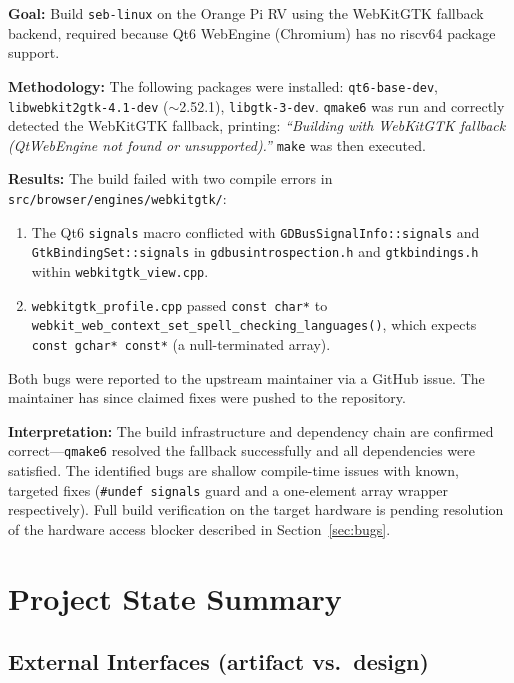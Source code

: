 \documentclass[11pt]{article}
\begin{document}
\textbf{Goal:} Build \texttt{seb-linux} on the Orange Pi RV using the WebKitGTK fallback backend, required because Qt6 WebEngine (Chromium) has no riscv64 package support.

\textbf{Methodology:} The following packages were installed: \texttt{qt6-base-dev}, \texttt{libwebkit2gtk-4.1-dev} ($\sim$2.52.1), \texttt{libgtk-3-dev}. \texttt{qmake6} was run and correctly detected the WebKitGTK fallback, printing: \textit{``Building with WebKitGTK fallback (QtWebEngine not found or unsupported).''} \texttt{make} was then executed.

\textbf{Results:} The build failed with two compile errors in \texttt{src/browser/engines/webkitgtk/}:
\begin{enumerate}
    \item The Qt6 \texttt{signals} macro conflicted with \texttt{GDBusSignalInfo::signals} and \texttt{GtkBindingSet::signals} in \texttt{gdbusintrospection.h} and \texttt{gtkbindings.h} within \texttt{webkitgtk\_view.cpp}.
    \item \texttt{webkitgtk\_profile.cpp} passed \texttt{const char*} to \texttt{webkit\_web\_context\_set\_spell\_checking\_languages()}, which expects \texttt{const gchar* const*} (a null-terminated array).
\end{enumerate}
Both bugs were reported to the upstream maintainer via a GitHub issue. The maintainer has since claimed fixes were pushed to the repository.

\textbf{Interpretation:} The build infrastructure and dependency chain are confirmed correct---\texttt{qmake6} resolved the fallback successfully and all dependencies were satisfied. The identified bugs are shallow compile-time issues with known, targeted fixes (\texttt{\#undef signals} guard and a one-element array wrapper respectively). Full build verification on the target hardware is pending resolution of the hardware access blocker described in Section~\ref{sec:bugs}.

\section{Project State Summary}

\subsection{External Interfaces (artifact vs.\ design)}
\end{document}
